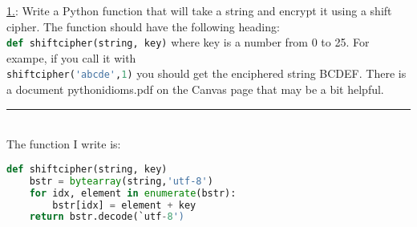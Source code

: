 \documentclass{article}
\newcommand{\statementsep}{\leavevmode\\[0.005in] \rule[\baselineskip/4]{\textwidth}{0.4pt}\leavevmode\\[0.005in]}
\begin{document}
\noindent\underline{1.}: Write a Python function that will take a string and encrypt it using a shift cipher. The function should have the following heading:\\[0.2in] 
\lstinline[language=python]!def shiftcipher(string, key)!
where key is a number from 0 to 25. For exampe, if you call it with \\[0.2in]
\lstinline[language=python]!shiftcipher('abcde',1)!
you should get the enciphered string BCDEF.
There is a document pythonidioms.pdf on the Canvas page that may be a bit helpful.  
\statementsep
The function I write is:
\begin{lstlisting}[language=python]
def shiftcipher(string, key)
    bstr = bytearray(string,'utf-8')
    for idx, element in enumerate(bstr):
        bstr[idx] = element + key
    return bstr.decode(`utf-8') 
\end{lstlisting}
\end{document}
